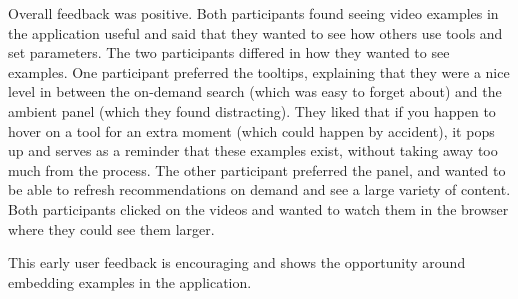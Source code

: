 Overall feedback was positive. Both participants found seeing video examples in the application useful and said that they wanted to see how others use tools and set parameters. The two participants differed in how they wanted to see examples. One participant preferred the tooltips, explaining that they were a nice level in between the on-demand search (which was easy to forget about) and the ambient panel (which they found distracting). They liked that if you happen to hover on a tool for an extra moment (which could happen by accident), it pops up and serves as a reminder that these examples exist, without taking away too much from the process. The other participant preferred the panel, and wanted to be able to refresh recommendations on demand and see a large variety of content. Both participants clicked on the videos and wanted to watch them in the browser where they could see them larger. 

This early user feedback is encouraging and shows the opportunity around embedding examples in the application.

